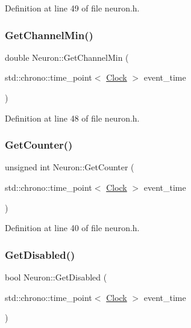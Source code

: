 Definition at line 49 of file neuron.\+h.

\mbox{\label{class_neuron_a794c8fa270ea0600dab4fd13c25912fd}} 
\subsubsection{\texorpdfstring{Get\+Channel\+Min()}{GetChannelMin()}}
{\footnotesize\ttfamily double Neuron\+::\+Get\+Channel\+Min (\begin{DoxyParamCaption}\item[{std\+::chrono\+::time\+\_\+point$<$ \mbox{\hyperlink{universe_8h_a0ef8d951d1ca5ab3cfaf7ab4c7a6fd80}{Clock}} $>$}]{event\+\_\+time }\end{DoxyParamCaption})\hspace{0.3cm}{\ttfamily [inline]}}



Definition at line 48 of file neuron.\+h.

\mbox{\label{class_neuron_a0b5fe55bf939808986b3697d18a834f4}} 
\subsubsection{\texorpdfstring{Get\+Counter()}{GetCounter()}}
{\footnotesize\ttfamily unsigned int Neuron\+::\+Get\+Counter (\begin{DoxyParamCaption}\item[{std\+::chrono\+::time\+\_\+point$<$ \mbox{\hyperlink{universe_8h_a0ef8d951d1ca5ab3cfaf7ab4c7a6fd80}{Clock}} $>$}]{event\+\_\+time }\end{DoxyParamCaption})\hspace{0.3cm}{\ttfamily [inline]}}



Definition at line 40 of file neuron.\+h.

\mbox{\label{class_neuron_adfee1a62df820344b84fe2020451b24f}} 
\subsubsection{\texorpdfstring{Get\+Disabled()}{GetDisabled()}}
{\footnotesize\ttfamily bool Neuron\+::\+Get\+Disabled (\begin{DoxyParamCaption}\item[{std\+::chrono\+::time\+\_\+point$<$ \mbox{\hyperlink{universe_8h_a0ef8d951d1ca5ab3cfaf7ab4c7a6fd80}{Clock}} $>$}]{event\+\_\+time }\end{DoxyParamCaption})\hspace{0.3cm}{\ttfamily [inline]}}



